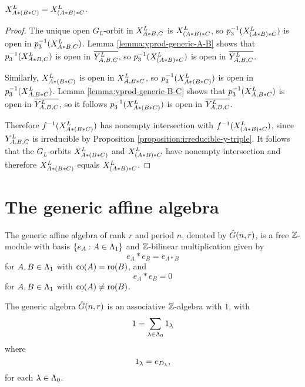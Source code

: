 \documentclass[a4paper, 11pt]{report}
\begin{document}
\begin{proposition}\label{proposition:associativity}
$\xprod[L]{A\ast (B\ast C)} = \xprod[L]{(A\ast B)\ast C}$.
\end{proposition}

\begin{proof}
The unique open $G_L$-orbit in $\xprod[L]{A\ast B, C}$ is $\xprod[L]{(A\ast B)\ast C}$, so $p_3^{-1}(\xprod[L]{(A\ast B)\ast C})$ is open in $p_3^{-1}(\xprod[L]{A\ast B,C})$. Lemma \ref{lemma:yprod-generic-A-B} shows that $p_3^{-1}(\xprod[L]{A\ast B,C})$ is open in $\overline{\yprod[L]{A,B,C}}$, so $p_3^{-1}(\xprod[L]{(A\ast B)\ast C})$ is open in $\overline{\yprod[L]{A,B,C}}$.

Similarly, $\xprod[L]{A\ast (B\ast C)}$ is open in $\xprod[L]{A,B\ast C}$, so $p_3^{-1}(\xprod[L]{A\ast (B\ast C)})$ is open in $p_3^{-1}(\xprod[L]{A,B\ast C})$. Lemma \ref{lemma:yprod-generic-B-C} shows that $p_3^{-1}(\xprod[L]{A,B\ast C})$ is open in $\overline{\yprod[L]{A,B,C}}$, so it follows $p_3^{-1}(\xprod[L]{A\ast (B\ast C)})$ is open in $\overline{\yprod[L]{A,B,C}}$.

Therefore $f^{-1}(\xprod[L]{A\ast (B\ast C)})$ has nonempty intersection with $f^{-1}(\xprod[L]{(A\ast B)\ast C})$, since $\yprod[L]{A,B,C}$ is irreducible by Proposition \ref{proposition:irreducible-y-triple}. It follows that the $G_L$-orbits $\xprod[L]{A\ast (B\ast C)}$ and $\xprod[L]{(A\ast B)\ast C}$ have nonempty intersection and therefore $\xprod[L]{A\ast (B\ast C)}$ equals $\xprod[L]{(A\ast B)\ast C}$.
\end{proof}


\section{The generic affine algebra}

The generic affine algebra of rank $r$ and period $n$, denoted by $\generic$, is a free $\integers$-module with basis $\{e_A:A\in\matrices\}$ and $\integers$-bilinear multiplication given by
\begin{equation*}
e_A\ast e_B = e_{A\ast B}
\end{equation*}
for $A,B\in\matrices$ with $\co{A}=\ro{B}$, and
\begin{equation*}
e_A\ast e_B = 0
\end{equation*}
for $A,B\in\matrices$ with $\co{A}\neq\ro{B}$.

\begin{theorem}\label{theorem:generic-algebra-associative}
The generic algebra $\generic$ is an associative $\integers$-algebra with $1$, with
\begin{equation*}
1=\sum_{\lambda\in\compositions} 1_\lambda
\end{equation*}
where
\begin{equation*}
1_\lambda = e_{\diag{\lambda}},
\end{equation*}
for each $\lambda\in\compositions$.
\end{theorem}
\end{document}
